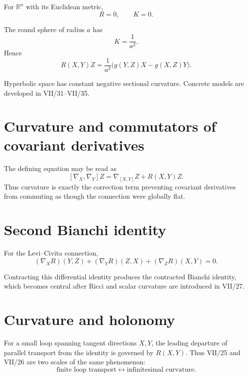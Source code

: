 \begin{example}\label{ex:vii26-euclidean}
For \(\mathbb R^n\) with its Euclidean metric,
\[
R=0,
\qquad
K=0.
\]
\end{example}

\begin{example}\label{ex:vii26-sphere}
The round sphere of radius \(a\) has
\[
K=\frac1{a^2}.
\]
Hence
\[
R(X,Y)Z
=
\frac1{a^2}
\bigl(g(Y,Z)X-g(X,Z)Y\bigr).
\]
\end{example}

\begin{example}\label{ex:vii26-hyperbolic}
Hyperbolic space has constant negative sectional curvature.  Concrete models are
developed in VII/31--VII/35.
\end{example}

\section{Curvature and commutators of covariant derivatives}

The defining equation may be read as
\[
[\nabla_X,\nabla_Y]Z
=
\nabla_{[X,Y]}Z+R(X,Y)Z.
\]
Thus curvature is exactly the correction term preventing covariant derivatives
from commuting as though the connection were globally flat.

\section{Second Bianchi identity}

\begin{theorem}\label{thm:vii26-bianchi2}
For the Levi--Civita connection,
\[
(\nabla_XR)(Y,Z)
+
(\nabla_YR)(Z,X)
+
(\nabla_ZR)(X,Y)
=
0.
\]
\end{theorem}

\begin{remark}
Contracting this differential identity produces the contracted Bianchi identity,
which becomes central after Ricci and scalar curvature are introduced in VII/27.
\end{remark}

\section{Curvature and holonomy}

For a small loop spanning tangent directions \(X,Y\), the leading departure of
parallel transport from the identity is governed by \(R(X,Y)\).  Thus VII/25 and
VII/26 are two scales of the same phenomenon:
\[
\text{finite loop transport}
\longleftrightarrow
\text{infinitesimal curvature}.
\]

